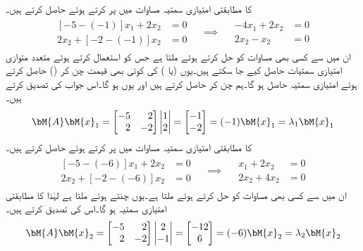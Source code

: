  کا مطابقتی امتیازی سمتیہ مساوات  میں  پر کرتے ہوئے حاصل کرتے ہیں۔
\begin{gather*}
\begin{aligned}
[-5-(-1)]x_1+2x_2&=0\\
2x_2+[-2-(-1)]x_2&=0
\end{aligned}\quad \implies \quad \begin{aligned} -4x_1+2x_2&=0\\2x_2-x_2&=0 \end{aligned}
\end{gather*}
ان میں سے کسی بھی مساوات کو حل کرتے ہوئے   ملتا ہے جس کو استعمال کرتے ہوئے متعدد متوازی امتیازی سمتیات حاصل کیے جا سکتے ہیں۔یوں  (یا ) کی کوئی بھی قیمت چن کر () حاصل کرتے ہوئے امتیازی سمتیہ حاصل ہو گا۔ہم  چن کر  حاصل کرتے ہیں اور یوں  ہو گا۔اس جواب کی تصدیق کرتے ہیں۔
\begin{align*}
\bM{A}\bM{x}_1=\begin{bmatrix*}[r] -5&2\\2&-2 \end{bmatrix*}\begin{vmatrix} 1\\2 \end{vmatrix}=\begin{bmatrix}-1\\-2  \end{bmatrix}=(-1)\bM{x}_1=\lambda_1\bM{x}_1
\end{align*}
 کا مطابقتی امتیازی سمتیہ مساوات  میں  پر کرتے ہوئے حاصل کرتے ہیں۔
\begin{gather*}
\begin{aligned}
[-5-(-6)]x_1+2x_2&=0\\
2x_2+[-2-(-6)]x_2&=0
\end{aligned}\quad \implies \quad \begin{aligned} x_1+2x_2&=0\\2x_2+4x_2&=0 \end{aligned}
\end{gather*}
ان میں سے کسی بھی مساوات کو حل کرتے ہوئے  ملتا ہے۔یوں  چنتے ہوئے   ملتا ہے لہٰذا  کا مطابقتی امتیازی سمتیہ  ہو گا۔اس کی تصدیق کرتے ہیں۔
\begin{align*}
\bM{A}\bM{x}_2=\begin{bmatrix*}[r] -5&2\\2&-2 \end{bmatrix*}\begin{vmatrix} 2\\-1 \end{vmatrix}=\begin{bmatrix}-12\\6  \end{bmatrix}=(-6)\bM{x}_2=\lambda_2\bM{x}_2
\end{align*}
